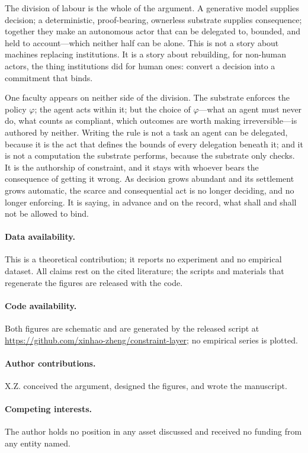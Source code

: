 \documentclass[11pt]{article}
\begin{document}
The division of labour is the whole of the argument. A generative model
supplies decision; a deterministic, proof-bearing, ownerless substrate
supplies consequence; together they make an autonomous actor that can be
delegated to, bounded, and held to account---which neither half can be
alone. This is not a story about machines replacing institutions. It is a
story about rebuilding, for non-human actors, the thing institutions did
for human ones: convert a decision into a commitment that binds.

One faculty appears on neither side of the division. The substrate
enforces the policy $\varphi$; the agent acts within it; but the choice
of $\varphi$---what an agent must never do, what counts as compliant,
which outcomes are worth making irreversible---is authored by neither.
Writing the rule is not a task an agent can be delegated, because it is
the act that defines the bounds of every delegation beneath it; and it is
not a computation the substrate performs, because the substrate only
checks. It is the authorship of constraint, and it stays with whoever
bears the consequence of getting it wrong. As decision grows abundant and
its settlement grows automatic, the scarce and consequential act is no
longer deciding, and no longer enforcing. It is saying, in advance and on
the record, what shall and shall not be allowed to bind.

\paragraph*{Data availability.}
This is a theoretical contribution; it reports no experiment and no
empirical dataset. All claims rest on the cited literature; the scripts
and materials that regenerate the figures are released with the code.

\paragraph*{Code availability.}
Both figures are schematic and are generated by the released script at
\url{https://github.com/xinhao-zheng/constraint-layer}; no empirical
series is plotted.

\paragraph*{Author contributions.}
X.Z. conceived the argument, designed the figures, and wrote the
manuscript.

\paragraph*{Competing interests.}
The author holds no position in any asset discussed and received no
funding from any entity named.
\end{document}
